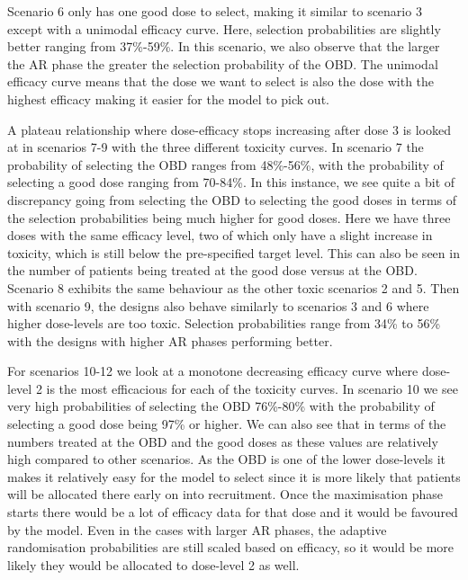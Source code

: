 Scenario 6 only has one good dose to select, making it similar to scenario 3 except with a unimodal efficacy curve. Here, selection probabilities are slightly better ranging from 37\%-59\%. In this scenario, we also observe that the larger the AR phase the greater the selection probability of the OBD. The unimodal efficacy curve means that the dose we want to select is also the dose with the highest efficacy making it easier for the model to pick out. 

A plateau relationship where dose-efficacy stops increasing after dose 3 is looked at in scenarios 7-9 with the three different toxicity curves. In scenario 7 the probability of selecting the OBD ranges from 48\%-56\%, with the probability of selecting a good dose ranging from 70-84\%. In this instance, we see quite a bit of discrepancy going from selecting the OBD to selecting the good doses in terms of the selection probabilities being much higher for good doses. Here we have three doses with the same efficacy level, two of which only have a slight increase in toxicity, which is still below the pre-specified target level. This can also be seen in the number of patients being treated at the good dose versus at the OBD. Scenario 8 exhibits the same behaviour as the other toxic scenarios 2 and 5. Then with scenario 9, the designs also behave similarly to scenarios 3 and 6 where higher dose-levels are too toxic. Selection probabilities range from 34\% to 56\% with the designs with higher AR phases performing better. 

For scenarios 10-12 we look at a monotone decreasing efficacy curve where dose-level 2 is the most efficacious for each of the toxicity curves. In scenario 10 we see very high probabilities of selecting the OBD 76\%-80\% with the probability of selecting a good dose being 97\% or higher. We can also see that in terms of the numbers treated at the OBD and the good doses as these values are relatively high compared to other scenarios. As the OBD is one of the lower dose-levels it makes it relatively easy for the model to select since it is more likely that patients will be allocated there early on into recruitment. Once the maximisation phase starts there would be a lot of efficacy data for that dose and it would be favoured by the model. Even in the cases with larger AR phases, the adaptive randomisation probabilities are still scaled based on efficacy, so it would be more likely they would be allocated to dose-level 2 as well. 

